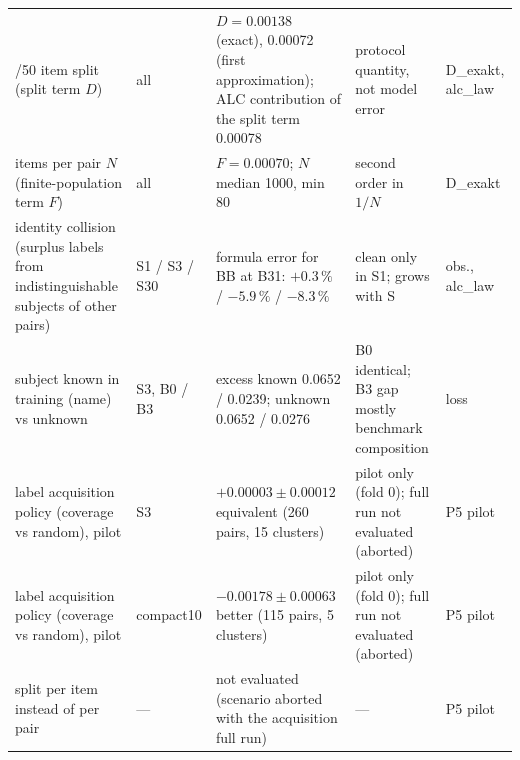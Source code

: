 \begin{table}[H]
\begin{tabular}{@{}>{\raggedright\arraybackslash}p{2.7cm}>{\raggedright\arraybackslash}p{1.2cm}>{\raggedright\arraybackslash}p{4.1cm}>{\raggedright\arraybackslash}p{2.7cm}l@{}}
50/50 item split (split term $D$) & all & $D = 0.00138$ (exact), 0.00072 (first approximation); ALC contribution of the split term 0.00078 & protocol quantity, not model error & D\_exakt, alc\_law \\
items per pair $N$ (finite-population term $F$) & all & $F = 0.00070$; $N$ median 1000, min 80 & second order in $1/N$ & D\_exakt \\
identity collision (surplus labels from indistinguishable subjects of other pairs) & S1 / S3 / S30 & formula error for BB at B31: $+0.3\,\%$ / $-5.9\,\%$ / $-8.3\,\%$ & clean only in S1; grows with S & obs., alc\_law \\
subject known in training (name) vs unknown & S3, B0 / B3 & excess known 0.0652 / 0.0239; unknown 0.0652 / 0.0276 & B0 identical; B3 gap mostly benchmark composition & loss \\
label acquisition policy (coverage vs random), pilot & S3 & $+0.00003 \pm 0.00012$ equivalent (260 pairs, 15 clusters) & pilot only (fold 0); full run not evaluated (aborted) & P5 pilot \\
label acquisition policy (coverage vs random), pilot & compact10 & $-0.00178 \pm 0.00063$ better (115 pairs, 5 clusters) & pilot only (fold 0); full run not evaluated (aborted) & P5 pilot \\
split per item instead of per pair & --- & not evaluated (scenario aborted with the acquisition full run) & --- & P5 pilot \\
\bottomrule
\end{tabular}
\end{table}

